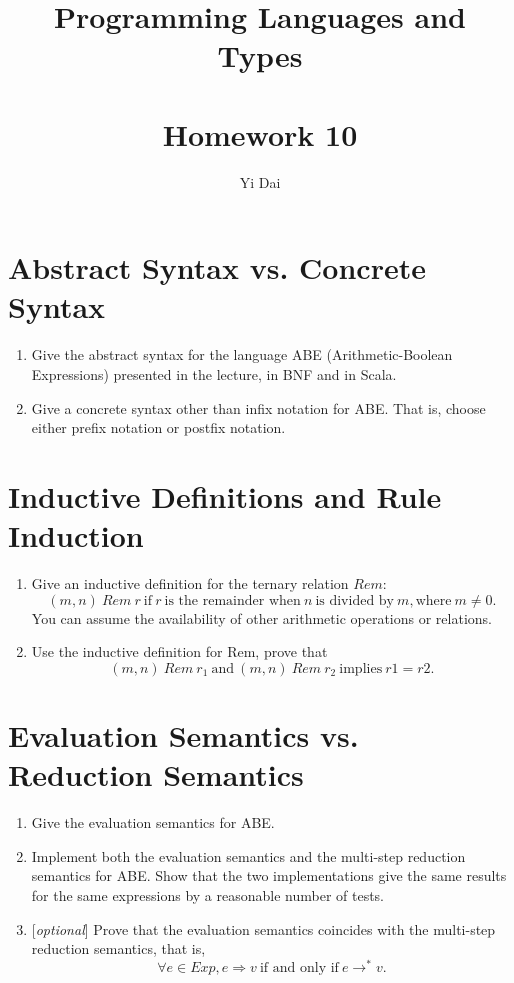 \documentclass[a4paper,12pt]{article}
\title{
 Programming Languages and Types \\~\\
 \textbf{Homework 10}
}
\author{
 Yi Dai
}
\begin{document}
\maketitle

\section{Abstract Syntax vs. Concrete Syntax}

\begin{enumerate}
 \item Give the abstract syntax for the language ABE (Arithmetic-Boolean Expressions)
  presented in the lecture, in BNF and in Scala.

 \item Give a concrete syntax other than infix notation for ABE. That is, choose either
  prefix notation or postfix notation.
\end{enumerate}

\section{Inductive Definitions and Rule Induction}

\begin{enumerate}
 \item Give an inductive definition for the ternary relation $Rem$:
  \[
    (m, n)\ Rem\ r\ \text{if}\ r\ \text{is the remainder when}\ n\ \text{is divided by}\
    m, \text{where}\ m \ne 0.
  \]
  You can assume the availability of other arithmetic operations or relations.

 \item Use the inductive definition for Rem, prove that
  \[
    (m, n)\ Rem\ r_1\ \text{and}\ (m, n)\ Rem\ r_2\ \text{implies}\ r1 = r2.
  \]
\end{enumerate}

\section{Evaluation Semantics vs. Reduction Semantics}

\begin{enumerate}
 \item Give the evaluation semantics for ABE.

 \item Implement both the evaluation semantics and the multi-step reduction semantics for
  ABE. Show that the two implementations give the same results for the same expressions by
  a reasonable number of tests.

 \item{} [\emph{optional}] Prove that the evaluation semantics coincides with the multi-step
  reduction semantics, that is,
  \[ \forall e \in Exp, e \Longrightarrow v\ \text{if and only if}\ e \longrightarrow^{*}
      v.
  \]
\end{enumerate}
\end{document}
